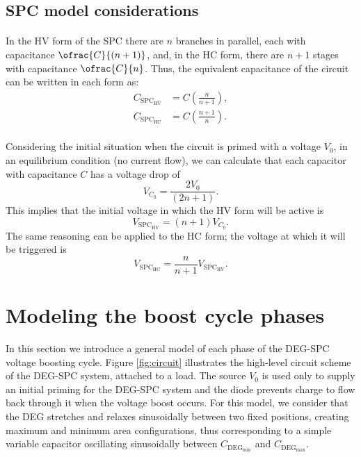 \subsection{SPC model considerations}
\paragraph{} In the HV form of the SPC there are $n$ branches in parallel, each with capacitance $\ofrac{C}{(n+1)}$, and, in the HC form, there are $n+1$ stages with capacitance $\ofrac{C}{n}$. Thus, the equivalent capacitance of the circuit can be written in each form as: \begin{align}
C_{\text{SPC}_\text{HV}}&=C\left(\frac{n}{n+1}\right),\label{eq:cspchv}\\
C_{\text{SPC}_\text{HC}}&=C\left(\frac{n+1}{n}\right).\label{eq:cspchc}
\end{align}

\paragraph{} Considering the initial situation when the circuit is primed with a voltage $V_0$, in an equilibrium condition (no current flow), we can calculate that each capacitor with capacitance $C$ has a voltage drop of
\begin{equation}
V_{C_{0}}=\frac{2V_{0}}{(2n+1)}.
\end{equation}
This implies that the initial voltage in which the HV form will be active is
\begin{equation}
V_{\text{SPC}_\text{HV}} = (n+1)V_{C_{0}}.
\end{equation}
The same reasoning can be applied to the HC form; the voltage at which it will be triggered is
\begin{equation}
V_{\text{SPC}_\text{HC}} = \frac{n}{n+1}V_{\text{SPC}_\text{HV}}.
\end{equation}

\section{Modeling the boost cycle phases}
In this section we introduce a general model of each phase of the DEG-SPC voltage boosting cycle.  Figure \ref{fig:circuit} illustrates the high-level circuit scheme of the DEG-SPC system, attached to a load. The source $V_0$ is used only to supply an initial priming for the DEG-SPC system and the diode prevents charge to flow back through it when the voltage boost occurs. For this model, we consider that the DEG stretches and relaxes sinusoidally between two fixed positions, creating maximum and minimum area configurations, thus corresponding to a simple variable capacitor oscillating sinusoidally between $C_{\text{DEG}_\text{min}}$ and $C_{\text{DEG}_\text{max}}$.

